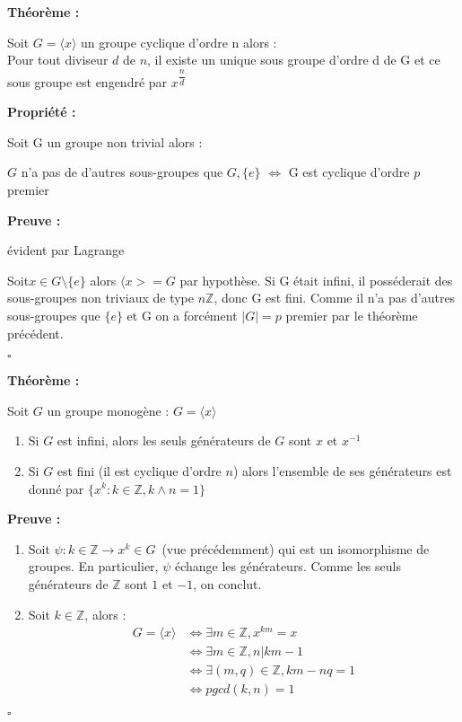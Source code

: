 \documentclass{report}
\renewenvironment{leftbar}{%
  \def\FrameCommand{\vrule width 0.4pt \hspace{10pt}}%
  \MakeFramed {\advance\hsize-\width \FrameRestore}}%
 {\endMakeFramed}%
\newenvironment{preuve}{\vspace*{0.5cm}
    \begin{leftbar}
    \noindent\textbf{Preuve :}\par}{
    \begin{flushright}
    $\square$
    \end{flushright}
    \end{leftbar}
}
\newenvironment{prop}{\begin{tcolorbox}[colframe= white]
    \textbf{Propriété :}
     \par}
    {\end{tcolorbox}}
\newenvironment{theoreme}[1][]{
    \begin{tcolorbox}[]
    \textbf{Théorème :} #1  \par} 
    {\end{tcolorbox}}
\newcommand{\Z}{\mathbb{Z}}
\begin{document}
\begin{theoreme}
Soit $G = \langle x \rangle$ un groupe cyclique d'ordre n alors :\\
Pour tout diviseur $d$ de $n$, il existe un unique sous groupe d'ordre d de G et ce sous groupe est engendré par $x^{\dfrac{n}{d}}$
\end{theoreme}

\begin{prop}

Soit G un groupe non trivial alors :

\begin{center}
$G$ n'a pas de d'autres sous-groupes que $G,\{ e \}$ $\Longleftrightarrow  $ G est cyclique d'ordre $p$ premier
\end{center} 
\end{prop}

\begin{preuve}
\fbox{$\Leftarrow$} évident par Lagrange


\noindent \fbox{$\Rightarrow$} Soit$x \in G\setminus\{e\}$ alors $\langle x>=G$ par hypothèse. Si G était infini, il posséderait des sous-groupes non triviaux de type $n\Z$, donc G est fini. Comme il n'a pas d'autres sous-groupes que $\{ e\}$ et G on a forcément $|G|=p$ premier par le théorème précédent.
\end{preuve}

\begin{theoreme}
	Soit $G$ un groupe monogène : $G=\langle x \rangle$
	\begin{enumerate}
		\item Si $G$ est infini, alors les seuls générateurs de $G$ sont $x$ et $x^{-1}$ 
		\item Si $G$ est fini (il est cyclique d'ordre $n$) alors l'ensemble de ses générateurs est donné par $\{x^k : k\in \mathbb{Z}, k \wedge n =1\}$
	\end{enumerate}
\end{theoreme}

\begin{preuve}
	\begin{enumerate}
	\item	Soit $\psi : k \in \mathbb{Z} \to x^k \in G \,$ (vue précédemment) qui est un isomorphisme de groupes. En particulier, $\psi$ échange les générateurs. Comme les seuls générateurs de $\mathbb{Z}$ sont $1$ et $-1$, on conclut. 
	\item	Soit $k \in \mathbb{Z}$, alors : 
		\begin{equation*} 
		\begin{split}
			G=\langle x \rangle  &  \iff \exists m \in \mathbb{Z}, x^{km}=x \\
 			& \iff \exists m \in \mathbb{Z}, n | km-1 \\
			&  \iff \exists (m,q)\in \mathbb{Z}, km-nq=1 \\
			& \iff pgcd(k,n)=1
		\end{split}
\end{equation*}
	
	\end{enumerate}
	

\end{preuve}
\end{document}
